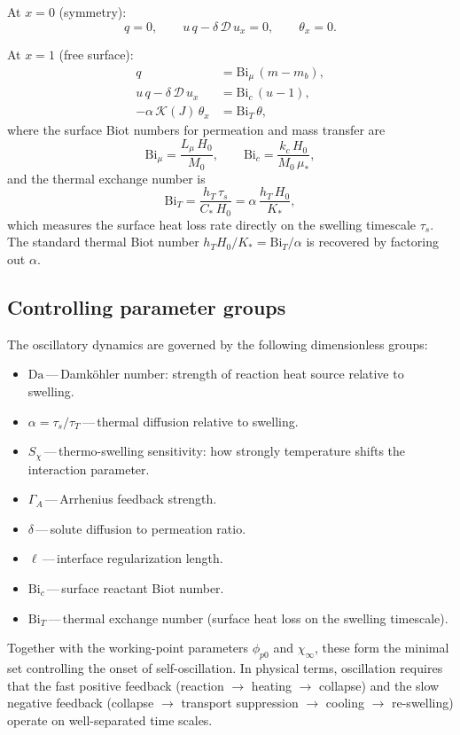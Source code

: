 \documentclass[aps,pre,reprint,superscriptaddress,longbibliography,floatfix]{revtex4-2}
\newcommand{\Ds}{\mathcal{D}}
\newcommand{\Ks}{\mathcal{K}}
\newcommand{\Da}{\mathrm{Da}}
\newcommand{\Bi}{\mathrm{Bi}}
\newcommand{\pp}{\phi_{p0}}
\begin{document}
At $x=0$ (symmetry):
\begin{equation}
  q = 0, \qquad
  u\,q - \delta\,\Ds\,u_x = 0, \qquad
  \theta_x = 0.
  \label{eq:bc0_nondim}
\end{equation}

At $x=1$ (free surface):
\begin{align}
  q &= \Bi_\mu\,(m - m_b), \label{eq:bc1_mu} \\
  u\,q - \delta\,\Ds\,u_x &= \Bi_c\,(u - 1), \label{eq:bc1_c} \\
  -\alpha\,\Ks(J)\,\theta_x &= \Bi_T\,\theta, \label{eq:bc1_T}
\end{align}
where the surface Biot numbers for permeation and mass transfer are
\begin{equation}
  \Bi_\mu = \frac{L_\mu\,H_0}{M_0},
  \qquad
  \Bi_c = \frac{k_c\,H_0}{M_0\,\mu_*},
  \label{eq:Bi_mu_c}
\end{equation}
and the thermal exchange number is
\begin{equation}
  \Bi_T = \frac{h_T\,\tau_s}{C_*\,H_0}
  = \alpha\,\frac{h_T\,H_0}{K_*},
  \label{eq:Bi_T}
\end{equation}
which measures the surface heat loss rate directly on the swelling
timescale $\tau_s$.  The standard thermal Biot number
$h_T H_0/K_*=\Bi_T/\alpha$ is recovered by factoring out $\alpha$.

\subsection{Controlling parameter groups}

The oscillatory dynamics are governed by the following dimensionless groups:
\begin{itemize}
  \item $\Da$\,---\,Damk\"ohler number: strength of reaction heat source relative to swelling.
  \item $\alpha = \tau_s/\tau_T$\,---\,thermal diffusion relative to swelling.
  \item $S_\chi$\,---\,thermo-swelling sensitivity: how strongly temperature shifts the interaction parameter.
  \item $\Gamma_A$\,---\,Arrhenius feedback strength.
  \item $\delta$\,---\,solute diffusion to permeation ratio.
  \item $\ell$\,---\,interface regularization length.
  \item $\Bi_c$\,---\,surface reactant Biot number.
  \item $\Bi_T$\,---\,thermal exchange number (surface heat loss on the swelling timescale).
\end{itemize}
Together with the working-point parameters $\pp$ and $\chi_\infty$, these form the minimal set controlling the onset of self-oscillation. In physical terms, oscillation requires that the fast positive feedback (reaction $\to$ heating $\to$ collapse) and the slow negative feedback (collapse $\to$ transport suppression $\to$ cooling $\to$ re-swelling) operate on well-separated time scales.
\end{document}
